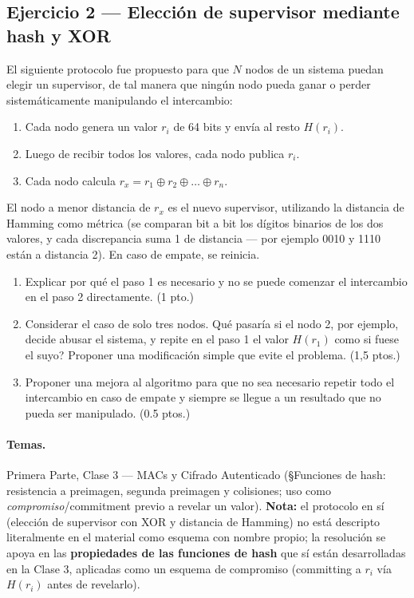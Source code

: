 \subsection{Ejercicio 2 --- Elección de supervisor mediante hash y XOR}

\begin{consigna}
El siguiente protocolo fue propuesto para que $N$ nodos de un sistema puedan elegir un
supervisor, de tal manera que ningún nodo pueda ganar o perder sistemáticamente
manipulando el intercambio:
\begin{enumerate}
  \item Cada nodo genera un valor $r_i$ de 64 bits y envía al resto $H(r_i)$.
  \item Luego de recibir todos los valores, cada nodo publica $r_i$.
  \item Cada nodo calcula $r_x = r_1 \oplus r_2 \oplus \dots \oplus r_n$.
\end{enumerate}
El nodo a menor distancia de $r_x$ es el nuevo supervisor, utilizando la distancia de
Hamming como métrica (se comparan bit a bit los dígitos binarios de los dos valores, y
cada discrepancia suma 1 de distancia --- por ejemplo 0010 y 1110 están a distancia 2).
En caso de empate, se reinicia.

\begin{enumerate}
  \item[a)] Explicar por qué el paso 1 es necesario y no se puede comenzar el intercambio
  en el paso 2 directamente. (1 pto.)
  \item[b)] Considerar el caso de solo tres nodos. \textquestiondown{}Qué pasaría si el nodo 2, por ejemplo,
  decide abusar el sistema, y repite en el paso 1 el valor $H(r_1)$ como si fuese el suyo?
  Proponer una modificación simple que evite el problema. (1,5 ptos.)
  \item[c)] Proponer una mejora al algoritmo para que no sea necesario repetir todo el
  intercambio en caso de empate y siempre se llegue a un resultado que no pueda ser
  manipulado. (0.5 ptos.)
\end{enumerate}
\end{consigna}

\paragraph{Temas.}
Primera Parte, Clase 3 --- MACs y Cifrado Autenticado (\S Funciones de hash: resistencia a
preimagen, segunda preimagen y colisiones; uso como \emph{compromiso}/commitment previo a
revelar un valor). \textbf{Nota:} el protocolo en sí (elección de supervisor con XOR y
distancia de Hamming) no está descripto literalmente en el material como esquema con
nombre propio; la resolución se apoya en las \textbf{propiedades de las funciones de hash}
que sí están desarrolladas en la Clase 3, aplicadas como un esquema de compromiso
(committing a $r_i$ vía $H(r_i)$ antes de revelarlo).

